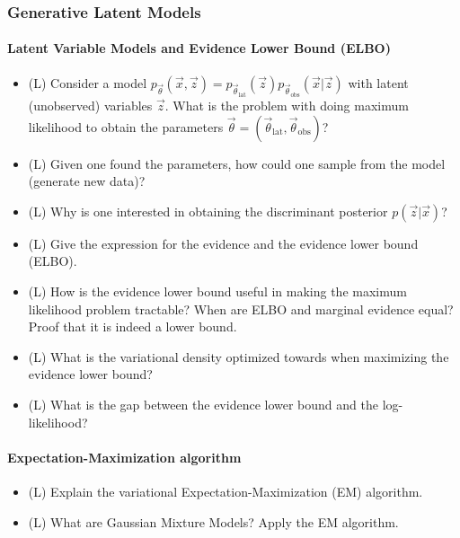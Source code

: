 \subsubsection*{Generative Latent Models}
\paragraph*{Latent Variable Models and Evidence Lower Bound (ELBO)}
\begin{itemize}
    \item (L) Consider a model $p_\vec{\theta}(\vec{x},\vec{z}) = p_{\vec{\theta}_{\text{lat}}}(\vec{z}) p_{\vec{\theta}_{\text{obs}}}(\vec{x} | \vec{z})$ with latent (unobserved) variables $\vec{z}$.
    What is the problem with doing maximum likelihood to obtain the parameters $\vec{\theta} = (\vec{\theta}_{\text{lat}}, \vec{\theta}_{\text{obs}})$?
    \answerboxM
    \item (L) Given one found the parameters, how could one sample from the model (generate new data)?
    \answerboxM
    \item (L) Why is one interested in obtaining the discriminant posterior $p(\vec{z} | \vec{x})$?
    \answerboxM
    \item (L) Give the expression for the evidence and the evidence lower bound (ELBO).
    \answerboxM
    \item (L) How is the evidence lower bound useful in making the maximum likelihood problem tractable? When are ELBO and marginal evidence equal? Proof that it is indeed a lower bound.
    \answerboxL
    \item (L) What is the variational density optimized towards when maximizing the evidence lower bound?
    \answerboxM
    \item (L) What is the gap between the evidence lower bound and the log-likelihood?
    \answerboxM
\end{itemize}

\paragraph*{Expectation-Maximization algorithm}
\begin{itemize}
    \item (L) Explain the variational Expectation-Maximization (EM) algorithm.
    \answerboxM
    \item (L) What are Gaussian Mixture Models? Apply the EM algorithm.
    \answerboxL
\end{itemize}

